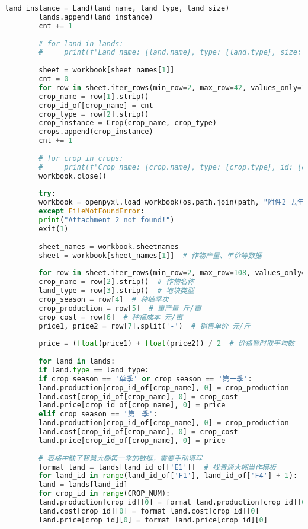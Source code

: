 \documentclass[a4paper]{article}
\begin{document}
\begin{lstlisting}[language=python,columns=fullflexible,frame=shadowbox]
		land_instance = Land(land_name, land_type, land_size)
		lands.append(land_instance)
		cnt += 1
		
		# for land in lands:
		#     print(f'Land name: {land.name}, type: {land.type}, size: {land.size}, id: {land_id_of[land.name]}')
		
		sheet = workbook[sheet_names[1]]
		cnt = 0
		for row in sheet.iter_rows(min_row=2, max_row=42, values_only=True):
		crop_name = row[1].strip()
		crop_id_of[crop_name] = cnt
		crop_type = row[2].strip()
		crop_instance = Crop(crop_name, crop_type)
		crops.append(crop_instance)
		cnt += 1
		
		# for crop in crops:
		#     print(f'Crop name: {crop.name}, type: {crop.type}, id: {crop_id_of[crop.name]}')
		workbook.close()
		
		try:
		workbook = openpyxl.load_workbook(os.path.join(path, "附件2_去年作物与收成情况.xlsx"))
		except FileNotFoundError:
		print("Attachment 2 not found!")
		exit(1)
		
		sheet_names = workbook.sheetnames
		sheet = workbook[sheet_names[1]]  # 作物产量、单价等数据
		
		for row in sheet.iter_rows(min_row=2, max_row=108, values_only=True):
		crop_name = row[2].strip()  # 作物名称
		land_type = row[3].strip()  # 地块类型
		crop_season = row[4]  # 种植季次
		crop_production = row[5]  # 亩产量 斤/亩
		crop_cost = row[6]  # 种植成本 元/亩
		price1, price2 = row[7].split('-')  # 销售单价 元/斤
		
		price = (float(price1) + float(price2)) / 2  # 价格暂时取平均数
		
		for land in lands:
		if land.type == land_type:
		if crop_season == '单季' or crop_season == '第一季':
		land.production[crop_id_of[crop_name], 0] = crop_production
		land.cost[crop_id_of[crop_name], 0] = crop_cost
		land.price[crop_id_of[crop_name], 0] = price
		elif crop_season == '第二季':
		land.production[crop_id_of[crop_name], 0] = crop_production
		land.cost[crop_id_of[crop_name], 0] = crop_cost
		land.price[crop_id_of[crop_name], 0] = price
		
		# 表格中缺了智慧大棚第一季的数据，需要手动填写
		format_land = lands[land_id_of['E1']]  # 找普通大棚当作模板
		for land_id in range(land_id_of['F1'], land_id_of['F4'] + 1):  # 智慧大棚
		land = lands[land_id]
		for crop_id in range(CROP_NUM):
		land.production[crop_id][0] = format_land.production[crop_id][0]
		land.cost[crop_id][0] = format_land.cost[crop_id][0]
		land.price[crop_id][0] = format_land.price[crop_id][0]
		

\end{lstlisting}
\end{document}

